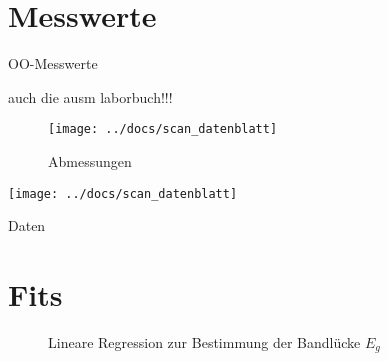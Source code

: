 \newpage

\onecolumn

\appendix

\section{Messwerte}
\label{sec:messwerte}
OO-Messwerte

auch die ausm laborbuch!!!

\begin{figure}[htb!]
 \centering
 \texttt{[image: ../docs/scan\_datenblatt]}
 \caption{Abmessungen}
 \label{fig:abmessungen}
\end{figure}



\begin{table}[htb!]
 \centering
 \texttt{[image: ../docs/scan\_datenblatt]}
 \caption{Daten}
 \label{tab:daten}
\end{table}

\section{Fits}
\label{sec:fits}

\begin{figure}[htbp]
  \newline
  \caption{Lineare Regression zur Bestimmung der Bandlücke $E_g$}
  \label{fig:ohne_hintergrund}
\end{figure}